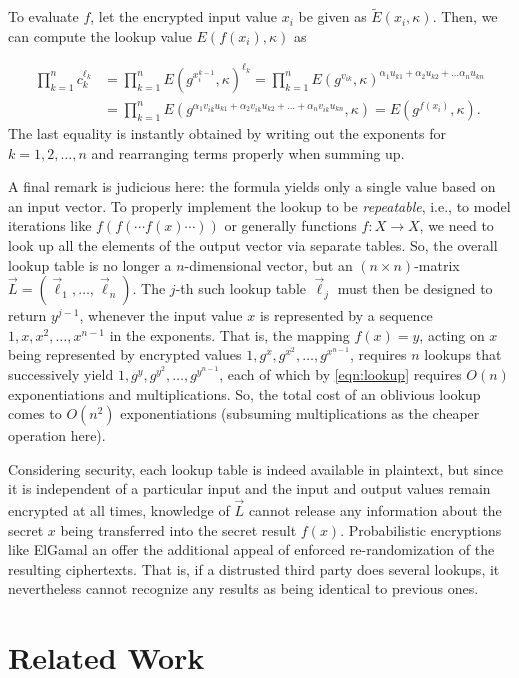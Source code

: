 \documentclass{llncs}
\begin{document}
To evaluate $f$, let the encrypted input value $x_i$ be given as $\tilde
E(x_i,\kappa)$. Then, we can compute the lookup value $E(f(x_i),\kappa)$ as

\begin{align}
    \prod_{k=1}^n c_k^{\ell_k} &= \prod_{k=1}^n E(g^{x_i^{k-1}},\kappa)^{\ell_k}
    = \prod_{k=1}^n E(g^{v_{ik}},\kappa)^{\alpha_1 u_{k1} + \alpha_2 u_{k2} + \ldots \alpha_n u_{kn}}\nonumber\\
    &=\prod_{k=1}^n E(g^{\alpha_1 v_{ik} u_{k1}+\alpha_2 v_{ik}u_{k2}+\ldots+\alpha_n v_{ik}u_{kn}},\kappa) = E(g^{f(x_i)},\kappa)\label{eqn:lookup}.
\end{align}
The last equality is instantly obtained by writing out the exponents for
$k=1,2,\ldots,n$ and rearranging terms properly when summing up.

A final remark is judicious here: the formula yields only a single value
based on an input vector. To properly implement the lookup to be
\emph{repeatable}, i.e., to model iterations like $f(f(\cdots f(x)\cdots))$
or generally functions $f:X\to X$, we need to look up all the elements of the
output vector via separate tables. So, the overall lookup table is no longer
a $n$-dimensional vector, but an $(n\times n)$-matrix $\vec L=(\vec
\ell_1,\ldots,\vec \ell_n)$. The $j$-th such lookup table $\vec \ell_j$ must
then be designed to return $y^{j-1}$, whenever the input value $x$ is
represented by a sequence $1,x,x^2,\ldots,x^{n-1}$ in the exponents. That is,
the mapping $f(x)=y$, acting on $x$ being represented by encrypted values
$1,g^x,g^{x^2},\ldots,g^{x^{n-1}}$, requires $n$ lookups that successively
yield $1,g^y,g^{y^2},\ldots,g^{y^{n-1}}$, each of which by \eqref{eqn:lookup}
requires $O(n)$ exponentiations and multiplications. So, the total cost of an
oblivious lookup comes to $O(n^2)$ exponentiations (subsuming multiplications
as the cheaper operation here).

Considering security, each lookup table is indeed available in plaintext, but
since it is independent of a particular input and the input and output values
remain encrypted at all times, knowledge of $\vec L$ cannot release any
information about the secret $x$ being transferred into the secret result
$f(x)$. Probabilistic encryptions like ElGamal an offer the additional appeal
of enforced re-randomization of the resulting ciphertexts. That is, if a
distrusted third party does several lookups, it nevertheless cannot recognize
any results as being identical to previous ones.

\section{Related Work}
\end{document}
